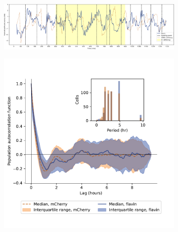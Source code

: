 \begin{figure}[p]
  \centering
  \begin{subfigure}[htpb]{1.0\textwidth}
   \centering
   \includegraphics[width=\textwidth]{htb2mCherry_613_plots_single_htb2mCherry012_90_2_adapted.pdf}
   \caption{
   }
   \label{fig:biology-kdeficient-single}
  \end{subfigure}

  \begin{subfigure}[htpb]{0.7\textwidth}
   \centering
   \includegraphics[width=\textwidth]{htb2mCherry_613_12.pdf}
   \caption{
   }
   \label{fig:biology-kdeficient-acf}
  \end{subfigure}


\end{figure}
